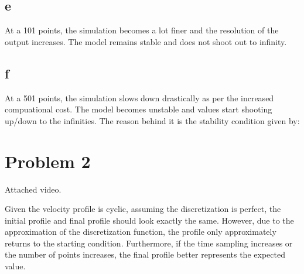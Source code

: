 \documentclass{article}
\begin{document}
\subsection{e}
At a 101 points, the simulation becomes a lot finer and the resolution of the output increases. The model remains stable and does not shoot out to infinity. 

\subsection{f}
At a 501 points, the simulation slows down drastically as per the increased compuational cost. The model becomes unstable and values start shooting up/down to the infinities. The reason behind it is the stability condition given by: \newline
\newline



\section{Problem 2}
Attached video. \newline
\newline

Given the velocity profile is cyclic, assuming the discretization is perfect, the initial profile and final profile should look exactly the same. However, due to the approximation of the discretization function, the profile only approximately returns to the starting condition. Furthermore, if the time sampling increases or the number of points increases, the final profile better represents the expected value.
\end{document}
